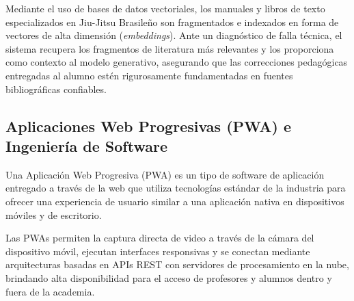 Mediante el uso de bases de datos vectoriales, los manuales y libros de texto especializados en Jiu-Jitsu Brasileño son fragmentados e indexados en forma de vectores de alta dimensión (\textit{embeddings}). Ante un diagnóstico de falla técnica, el sistema recupera los fragmentos de literatura más relevantes y los proporciona como contexto al modelo generativo, asegurando que las correcciones pedagógicas entregadas al alumno estén rigurosamente fundamentadas en fuentes bibliográficas confiables.

\subsection{Aplicaciones Web Progresivas (PWA) e Ingeniería de Software}
Una Aplicación Web Progresiva (PWA) es un tipo de software de aplicación entregado a través de la web que utiliza tecnologías estándar de la industria para ofrecer una experiencia de usuario similar a una aplicación nativa en dispositivos móviles y de escritorio.

Las PWAs permiten la captura directa de video a través de la cámara del dispositivo móvil, ejecutan interfaces responsivas y se conectan mediante arquitecturas basadas en APIs REST con servidores de procesamiento en la nube, brindando alta disponibilidad para el acceso de profesores y alumnos dentro y fuera de la academia.
